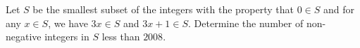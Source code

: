 Let $ S$ be the smallest subset of the integers with the property that $ 0\in S$ and for any $ x\in S$, we have $ 3x\in S$ and $ 3x + 1\in S$. Determine the number of non-negative integers in $ S$ less than $ 2008$.

